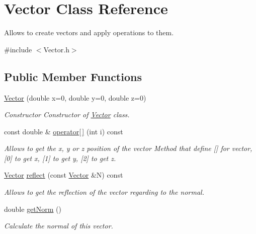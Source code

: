 \hypertarget{classVector}{}\section{Vector Class Reference}
\label{classVector}


Allows to create vectors and apply operations to them.  




{\ttfamily \#include $<$Vector.\+h$>$}

\subsection*{Public Member Functions}
\begin{DoxyCompactItemize}
\item 
\hyperlink{classVector_aae7788ced072bf8f5bb4b0fcb6fb6ad2}{Vector} (double x=0, double y=0, double z=0)
\begin{DoxyCompactList}\small\item\em Constructor Constructor of \hyperlink{classVector}{Vector} class. \end{DoxyCompactList}\item 
const double \& \hyperlink{classVector_ae78b4372ba99bf1f50cb76078f48df99}{operator\mbox{[}$\,$\mbox{]}} (int i) const
\begin{DoxyCompactList}\small\item\em Allows to get the x, y or z position of the vector Method that define \mbox{[}\mbox{]} for vector, \mbox{[}0\mbox{]} to get x, \mbox{[}1\mbox{]} to get y, \mbox{[}2\mbox{]} to get z. \end{DoxyCompactList}\item 
\hyperlink{classVector}{Vector} \hyperlink{classVector_a99c9023bbfa62e9de503a19d5adf2527}{reflect} (const \hyperlink{classVector}{Vector} \&N) const
\begin{DoxyCompactList}\small\item\em Allows to get the reflection of the vector regarding to the normal. \end{DoxyCompactList}\item 
double \hyperlink{classVector_ac9ec1192304bb0bae095eaa958187db2}{get\+Norm} ()
\begin{DoxyCompactList}\small\item\em Calculate the normal of this vector. \end{DoxyCompactList}\item 
\mbox{\label{classVector_a8797efbdda6679ab6da996e7ebaaae36}} 

\end{DoxyCompactItemize}
